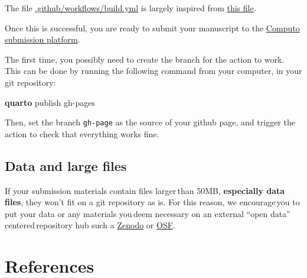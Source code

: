 \documentclass[
  11pt,
  a4paper,
]{article}
\newenvironment{Shaded}{}{}
\newcommand{\ExtensionTok}[1]{\textcolor[rgb]{0.84,0.23,0.29}{\textbf{#1}}}
\newcommand{\NormalTok}[1]{\textcolor[rgb]{0.14,0.16,0.18}{#1}}
\theoremstyle{plain}
\theoremstyle{remark}
\begin{document}
The file
\href{https://github.com/computorg/template-computo-R/blob/main/.github/workflows/build.yml}{.github/workflows/build.yml}
is largely inspired from
\href{https://quarto.org/docs/publishing/github-pages.html\#example-knitr-with-renv}{this
file}.

Once this is successful, you are ready to submit your manuscript to the
\href{https://computo.scholasticahq.com/}{Computo submission platform}.

\begin{tcolorbox}[enhanced jigsaw, breakable, toptitle=1mm, arc=.35mm, bottomtitle=1mm, colback=white, colframe=quarto-callout-warning-color-frame, opacitybacktitle=0.6, colbacktitle=quarto-callout-warning-color!10!white, opacityback=0, toprule=.15mm, leftrule=.75mm, left=2mm, title=\textcolor{quarto-callout-warning-color}{\faExclamationTriangle}\hspace{0.5em}{Warning}, rightrule=.15mm, titlerule=0mm, bottomrule=.15mm, coltitle=black]

The first time, you possibly need to create the branch for the action to
work. This can be done by running the following command from your
computer, in your git repository:

\begin{Shaded}
\begin{Highlighting}[]
\ExtensionTok{quarto}\NormalTok{ publish gh{-}pages}
\end{Highlighting}
\end{Shaded}

Then, set the branch \texttt{gh-page} as the source of your github page,
and trigger the action to check that everything works fine.

\end{tcolorbox}

\subsection{Data and large files}\label{data-and-large-files}

If your submission materials contain files larger\,than 50MB,
\textbf{especially data files}, they won't fit on a git repository as
is. For this reason, we encourage\,you to put your data or any materials
you\,deem necessary on an external ``open data'' centered\,repository
hub such a \href{https://zenodo.org/}{Zenodo} or
\href{https://osf.io/}{OSF}.

\section*{References}\label{references}
\end{document}
